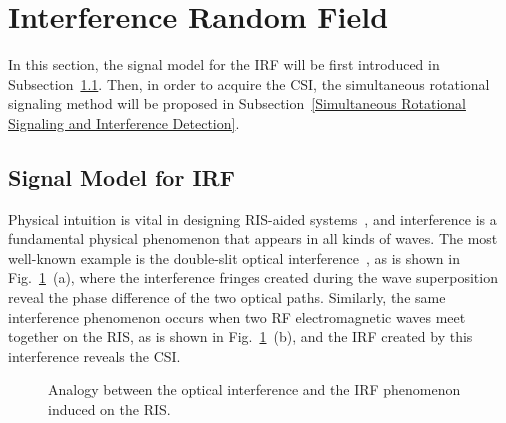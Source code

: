 \documentclass[journal,twocolumn]{IEEEtran}
\theoremstyle{nonumberplain}
\begin{document}
\section{Interference Random Field}
\label{Interference Random Field}
    In this section, the signal model for the \ac{IRF} will be first introduced in Subsection~\ref{Models for IRFs}. Then, in order to acquire the CSI, the simultaneous rotational signaling method will be proposed in Subsection~\ref{Simultaneous Rotational Signaling and Interference Detection}. 

\subsection{Signal Model for IRF}
\label{Models for IRFs}

    Physical intuition is vital in designing RIS-aided systems~\cite{najafi2020physics}, and interference is a fundamental physical phenomenon that appears in all kinds of waves. The most well-known example is the double-slit optical interference~\cite{louradour1993interference}, as is shown in Fig.~\ref{fig:scheme}~(a), where the interference fringes created during the wave superposition reveal the phase difference of the two optical paths. Similarly, the same interference phenomenon occurs when two RF electromagnetic waves meet together on the RIS, as is shown in Fig.~\ref{fig:scheme}~(b), and the \ac{IRF} created by this interference reveals the \ac{CSI}. 
    \ifx\onecol\undefined
    \begin{figure}[t]
        \centering
        \caption{Analogy between the optical interference and the \ac{IRF} phenomenon induced on the RIS.}
        \label{fig:scheme}
    \end{figure}
\end{document}

